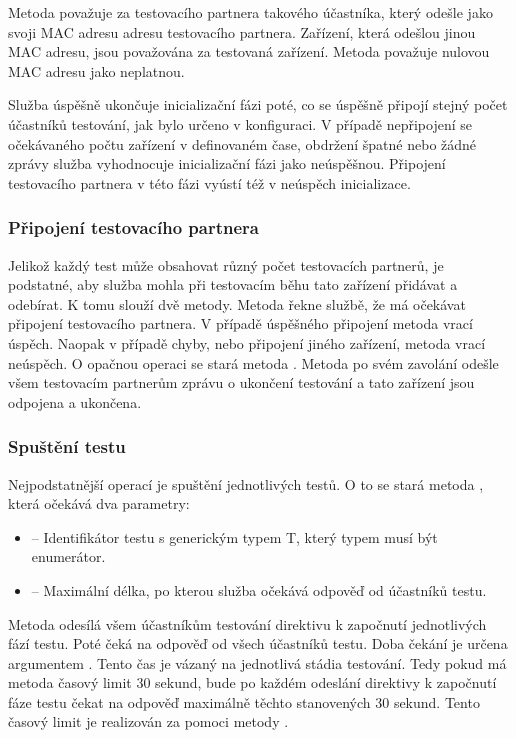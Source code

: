 Metoda  považuje za testovacího partnera takového účastníka, který odešle jako svoji MAC adresu adresu testovacího partnera. Zařízení, která odešlou jinou MAC adresu, jsou považována za testovaná zařízení. Metoda považuje nulovou MAC adresu jako neplatnou.

Služba úspěšně ukončuje inicializační fázi poté, co se úspěšně připojí stejný počet účastníků testování, jak bylo určeno v konfiguraci. V případě nepřipojení se očekávaného počtu zařízení v definovaném čase, obdržení špatné nebo žádné zprávy služba vyhodnocuje inicializační fázi jako neúspěšnou. Připojení testovacího partnera v této fázi vyústí též v neúspěch inicializace. 

\subsubsection{Připojení testovacího partnera}

Jelikož každý test může obsahovat různý počet testovacích partnerů, je podstatné, aby služba mohla při testovacím běhu tato zařízení přidávat a odebírat. K tomu slouží dvě metody. Metoda  řekne službě, že má očekávat připojení testovacího partnera. V případě úspěšného připojení metoda vrací úspěch. Naopak v případě chyby, nebo připojení jiného zařízení, metoda vrací neúspěch. O opačnou operaci se stará metoda . Metoda po svém zavolání odešle všem testovacím partnerům zprávu o ukončení testování a tato zařízení jsou odpojena a ukončena.

\subsubsection{Spuštění testu}

Nejpodstatnější operací je spuštění jednotlivých testů. O to se stará metoda , která očekává dva parametry:

\begin{itemize}
    \item {} -- Identifikátor testu s generickým typem T, který typem musí být enumerátor.
    \item {} -- Maximální délka, po kterou služba očekává odpověď od účastníků testu. 
\end{itemize}

Metoda odesílá všem účastníkům testování direktivu k započnutí jednotlivých fází testu. Poté čeká na odpověď od všech účastníků testu. Doba čekání je určena argumentem . Tento čas je vázaný na jednotlivá stádia testování. Tedy pokud má metoda časový limit 30 sekund, bude po každém odeslání direktivy k započnutí fáze testu čekat na odpověď maximálně těchto stanovených 30 sekund. Tento časový limit je realizován za pomoci metody .

